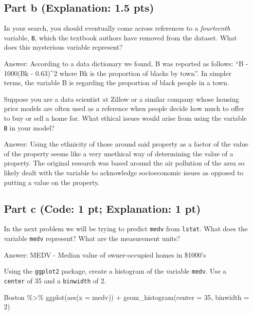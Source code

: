 \documentclass[
]{article}
\newenvironment{Shaded}{\begin{snugshade}}{\end{snugshade}}
\newcommand{\AttributeTok}[1]{\textcolor[rgb]{0.77,0.63,0.00}{#1}}
\newcommand{\DecValTok}[1]{\textcolor[rgb]{0.00,0.00,0.81}{#1}}
\newcommand{\FunctionTok}[1]{\textcolor[rgb]{0.00,0.00,0.00}{#1}}
\newcommand{\NormalTok}[1]{#1}
\newcommand{\SpecialCharTok}[1]{\textcolor[rgb]{0.00,0.00,0.00}{#1}}
\begin{document}
\hypertarget{part-b-explanation-1.5-pts}{%
\subsection{Part b (Explanation: 1.5
pts)}\label{part-b-explanation-1.5-pts}}

In your search, you should eventually come across references to a
\emph{fourteenth} variable, \texttt{B}, which the textbook authors have
removed from the dataset. What does this mysterious variable represent?

Answer: According to a data dictionary we found, B was reported as
follows: ``B - 1000(Bk - 0.63)\^{}2 where Bk is the proportion of blacks
by town''. In simpler terms, the variable B is regarding the proportion
of black people in a town.

Suppose you are a data scientist at Zillow or a similar company whose
housing price models are often used as a reference when people decide
how much to offer to buy or sell a home for. What ethical issues would
arise from using the variable \texttt{B} in your model?

Answer: Using the ethnicity of those around said property as a factor of
the value of the property seems like a very unethical way of determining
the value of a property. The original research was based around the air
pollution of the area so likely dealt with the variable to acknowledge
socioeconomic issues as opposed to putting a value on the property.

\hypertarget{part-c-code-1-pt-explanation-1-pt}{%
\subsection{Part c (Code: 1 pt; Explanation: 1
pt)}\label{part-c-code-1-pt-explanation-1-pt}}

In the next problem we will be trying to predict \texttt{medv} from
\texttt{lstat}. What does the variable \texttt{medv} represent? What are
the measurement units?

Answer: MEDV - Median value of owner-occupied homes in \$1000's

Using the \texttt{ggplot2} package, create a histogram of the variable
\texttt{medv}. Use a \texttt{center} of 35 and a \texttt{binwidth} of 2.

\begin{Shaded}
\begin{Highlighting}[]
\NormalTok{Boston }\SpecialCharTok{\%\textgreater{}\%} 
  \FunctionTok{ggplot}\NormalTok{(}\FunctionTok{aes}\NormalTok{(}\AttributeTok{x =}\NormalTok{ medv)) }\SpecialCharTok{+}
  \FunctionTok{geom\_histogram}\NormalTok{(}\AttributeTok{center =} \DecValTok{35}\NormalTok{, }\AttributeTok{binwidth =} \DecValTok{2}\NormalTok{)}
\end{Highlighting}
\end{Shaded}
\end{document}
